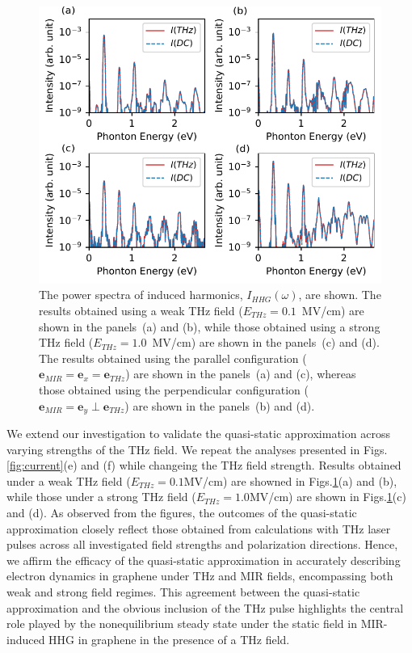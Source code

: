 \begin{figure}[tb]
	\includegraphics[width=0.9\linewidth]{pic/SI_hhg.pdf}
	\caption{\label{fig:quasi-static}
		The power spectra of induced harmonics, $I_{HHG}(\omega)$, are shown. The results obtained using a weak THz field ($E_{THz}=0.1$~MV/cm) are shown in the panels~(a) and (b), while those obtained using a strong THz field ($E_{THz}=1.0$~MV/cm) are shown in the panels~(c) and (d). The results obtained using the parallel configuration ($\mathbf e_{MIR}=\mathbf e_x = \mathbf e_{THz}$) are shown in the panels~(a) and (c), whereas those obtained using the perpendicular configuration ($\mathbf e_{MIR}=\mathbf e_y \perp \mathbf e_{THz}$) are shown in the panels~(b) and (d).
	}
\end{figure}

We extend our investigation to validate the quasi-static approximation across varying strengths of the THz field. We repeat the analyses presented in Figs.\ref{fig:current}(e) and (f) while changeing the THz field strength. Results obtained under a weak THz field ($E_{THz}=0.1$MV/cm) are showned in Figs.\ref{fig:quasi-static}(a) and (b), while those under a strong THz field ($E_{THz}=1.0$MV/cm) are shown in Figs.\ref{fig:quasi-static}(c) and (d). As observed from the figures, the outcomes of the quasi-static approximation closely reflect those obtained from calculations with THz laser pulses across all investigated field strengths and polarization directions. Hence, we affirm the efficacy of the quasi-static approximation in accurately describing electron dynamics in graphene under THz and MIR fields, encompassing both weak and strong field regimes.
This agreement between the quasi-static approximation and the obvious inclusion of the THz pulse highlights the central role played by the nonequilibrium steady state under the static field in MIR-induced HHG in graphene in the presence of a THz field.

